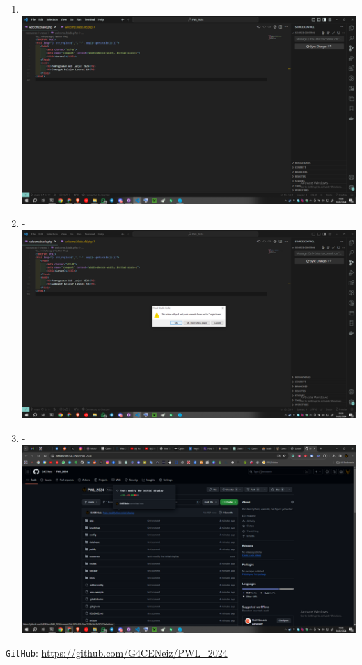 \documentclass[12pt,titlepage]{article}
\begin{document}
\begin{enumerate}[label= \alph*.]
    \item - \\ \includegraphics[width=.9\textwidth]{images/figures/Source Control 4.png}
    \newpage
    \item - \\ \includegraphics[width=.9\textwidth]{images/figures/Source Control 5.png}
    \item - \\ \includegraphics[width=.9\textwidth]{images/figures/Source Control 6.png}
\end{enumerate}

\texttt{GitHub}: \url{https://github.com/G4CENeiz/PWL_2024}
\end{document}
